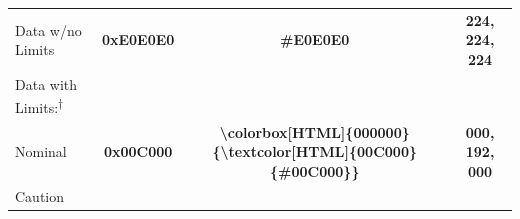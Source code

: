 \documentclass[
]{book}
\begin{document}
\begin{enumerate}
\begin{enumerate}
\begin{longtable}[]{@{}lccc@{}}
    \begin{minipage}[t]{0.30\columnwidth}\raggedright
    Data w/no Limits\strut
    \end{minipage} & \begin{minipage}[t]{0.19\columnwidth}\centering
    \textbf{\colorbox[HTML]{000000}{\textcolor[HTML]{E0E0E0}{0xE0E0E0}}}\strut
    \end{minipage} & \begin{minipage}[t]{0.19\columnwidth}\centering
    \textbf{\colorbox[HTML]{000000}{\textcolor[HTML]{E0E0E0}{#E0E0E0}}}\strut
    \end{minipage} & \begin{minipage}[t]{0.21\columnwidth}\centering
    \textbf{\colorbox[HTML]{000000}{\textcolor[HTML]{E0E0E0}{224, 224, 224}}}\strut
    \end{minipage}\tabularnewline
    \begin{minipage}[t]{0.30\columnwidth}\raggedright
    Data with Limits:\textsuperscript{†}\strut
    \end{minipage} & \begin{minipage}[t]{0.19\columnwidth}\centering
    \strut
    \end{minipage} & \begin{minipage}[t]{0.19\columnwidth}\centering
    \strut
    \end{minipage} & \begin{minipage}[t]{0.21\columnwidth}\centering
    \strut
    \end{minipage}\tabularnewline
    \begin{minipage}[t]{0.30\columnwidth}\raggedright
    Nominal\strut
    \end{minipage} & \begin{minipage}[t]{0.19\columnwidth}\centering
    \textbf{\colorbox[HTML]{000000}{\textcolor[HTML]{00C000}{0x00C000}}}\strut
    \end{minipage} & \begin{minipage}[t]{0.19\columnwidth}\centering
    \textbf{\textbackslash colorbox{[}HTML{]}\{000000\}\{\textbackslash textcolor{[}HTML{]}\{00C000\}\{\#00C000\}\}}\strut
    \end{minipage} & \begin{minipage}[t]{0.21\columnwidth}\centering
    \textbf{\colorbox[HTML]{000000}{\textcolor[HTML]{00C000}{000, 192, 000}}}\strut
    \end{minipage}\tabularnewline
    \begin{minipage}[t]{0.30\columnwidth}\raggedright
    Caution\strut

\end{minipage}
\end{longtable}
\end{enumerate}
\end{enumerate}
\end{document}
